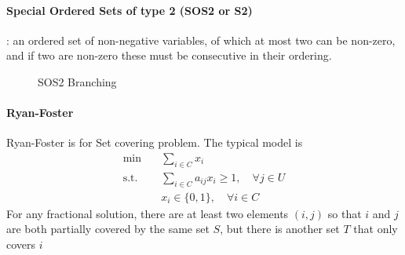             \paragraph{Special Ordered Sets of type 2 (SOS2 or S2)}: an ordered set of non-negative variables, of which at most two can be non-zero, and if two are non-zero these must be consecutive in their ordering. 

                \begin{figure}[H]
                    \centering
                    \caption{SOS2 Branching}
                \end{figure}
                      
            \paragraph{Ryan-Foster}
                Ryan-Foster is for Set covering problem. The typical model is
                \begin{align*}
                    \text{min} \quad & \sum_{i \in C} x_i \\
                    \text{s.t.} \quad & \sum_{i \in C} a_{ij}x_{i} \ge 1, \quad \forall j \in U \\
                            & x_i \in \{0, 1\}, \quad \forall i \in C 
                \end{align*}
                For any fractional solution, there are at least two elements $(i,j)$ so that $i$ and $j$ are both partially covered by the same set $S$, but there is another set $T$ that only covers $i$
                
